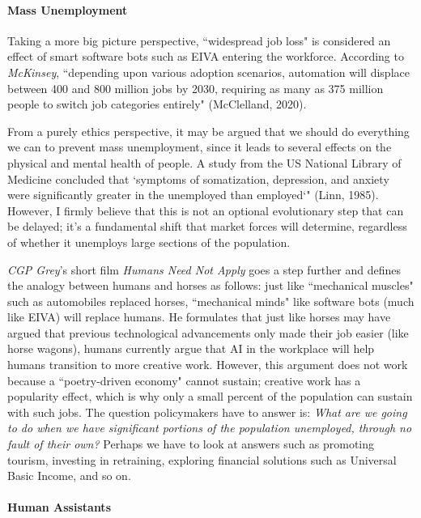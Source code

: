 \documentclass{article}
\begin{document}
\paragraph{Mass Unemployment}

Taking a more big picture perspective, ``widespread job loss" is considered an effect of smart software bots such as EIVA entering the workforce. According to \emph{McKinsey}, ``depending upon various adoption scenarios, automation will displace between 400 and 800 million jobs by 2030, requiring as many as 375 million people to switch job categories entirely" (McClelland, 2020).

From a purely ethics perspective, it may be argued that we should do everything we can to prevent mass unemployment, since it leads to several effects on the physical and mental health of people. A study from the US National Library of Medicine concluded that `symptoms of somatization, depression, and anxiety were significantly greater in the unemployed than employed`" (Linn, 1985). However, I firmly believe that this is not an optional evolutionary step that can be delayed; it's a fundamental shift that market forces will determine, regardless of whether it unemploys large sections of the population.

\emph{CGP Grey}'s short film \emph{Humans Need Not Apply} goes a step further and defines the analogy between humans and horses as follows: just like ``mechanical muscles" such as automobiles replaced horses, ``mechanical minds" like software bots (much like EIVA) will replace humans. He formulates that just like horses may have argued that previous technological advancements only made their job easier (like horse wagons), humans currently argue that AI in the workplace will help humans transition to more creative work. However, this argument does not work because a ``poetry-driven economy" cannot sustain; creative work has a popularity effect, which is why only a small percent of the population can sustain with such jobs. The question policymakers have to answer is: \emph{What are we going to do when we have significant portions of the population unemployed, through no fault of their own?} Perhaps we have to look at answers such as promoting tourism, investing in retraining, exploring financial solutions such as Universal Basic Income, and so on.

\paragraph{Human Assistants}
\end{document}
